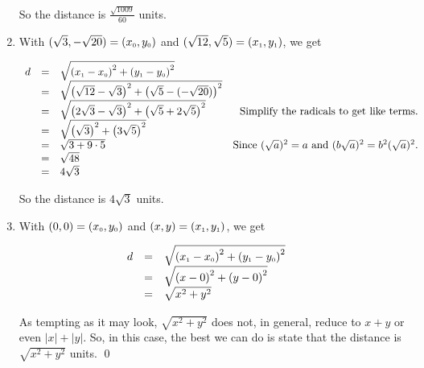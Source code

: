 \begin{ex}
\begin{enumerate}
\setlength{\extrarowheight}{2pt}

\medskip

So the distance is $\frac{\sqrt{1009}}{60}$ units.

\item With $(\sqrt{3}, -\sqrt{20}) =  \left(x_{\mbox{\tiny$0$}}, y_{\mbox{\tiny$0$}}\right)$ and  $(\sqrt{12}, \sqrt{5}) = \left(x_{\mbox{\tiny$1$}}, y_{\mbox{\tiny$1$}}\right)$, we get

\setlength{\extrarowheight}{3pt}

\[ \begin{array}{rclr}

 d & = & \sqrt{\left(x_{\mbox{\tiny$1$}} - x_{\mbox{\tiny$0$}} \right)^2 + \left(y_{\mbox{\tiny$1$}} - y_{\mbox{\tiny$0$}} \right)^2} & \\
   & = & \sqrt{ \left(\sqrt{12}- \sqrt{3} \right)^2 + \left(\sqrt{5} - (-\sqrt{20})\right)^2} & \\
   & = & \sqrt{\left(2\sqrt{3} - \sqrt{3} \right)^2 + \left(\sqrt{5}+2\sqrt{5} \right)^2} &  \text{Simplify the radicals to get like terms.}\\
   & = & \sqrt{\left(\sqrt{3}\right)^2 + \left(3 \sqrt{5}\right)^2} &  \\
   & = & \sqrt{3 + 9 \cdot 5} & \text{Since $(\sqrt{a})^2 = a$ and $(b \sqrt{a})^2 = b^2 (\sqrt{a})^2$.} \\
   & = & \sqrt{48} &  \\
   & = & 4\sqrt{3} &  \end{array} \]

\setlength{\extrarowheight}{2pt}

\medskip

So the distance is $4\sqrt{3}$ units.

\item With $(0, 0) =  \left(x_{\mbox{\tiny$0$}}, y_{\mbox{\tiny$0$}}\right)$ and  $(x,y) = \left(x_{\mbox{\tiny$1$}}, y_{\mbox{\tiny$1$}}\right)$, we get

\setlength{\extrarowheight}{3pt}

\[ \begin{array}{rclr}

 d & = & \sqrt{\left(x_{\mbox{\tiny$1$}} - x_{\mbox{\tiny$0$}} \right)^2 + \left(y_{\mbox{\tiny$1$}} - y_{\mbox{\tiny$0$}} \right)^2} & \\
   & = & \sqrt{ \left(x- 0\right)^2 + \left(y - 0\right)^2} & \\
   & = & \sqrt{x^2+y^2} & \end{array} \]

\setlength{\extrarowheight}{2pt}

\medskip

As tempting as it may look, $\sqrt{x^2+y^2}$ does not, in general, reduce to $x + y$ or even $|x| + |y|$.  So, in this case, the best we can do is state that the distance is $\sqrt{x^2+y^2}$ units. \qed


\end{enumerate} 

\end{ex}

